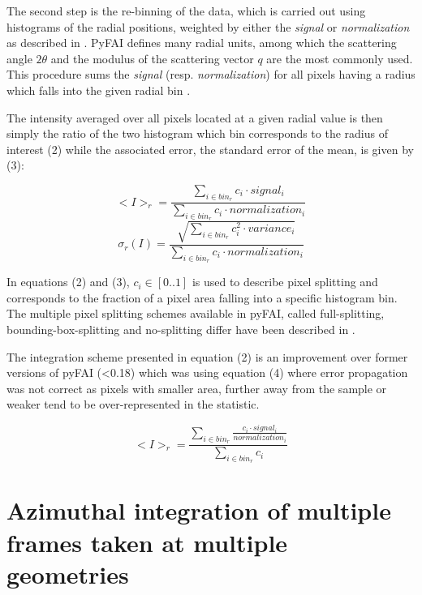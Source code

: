 \documentclass[preprint]{iucr}              %
\begin{document}
The second step is the re-binning of the data, which is carried out 
using histograms of the radial positions, 
weighted by either the \textit{signal} or \textit{normalization}
as described in .
PyFAI defines many radial units, among which the scattering angle $2\theta$
and the modulus of the scattering vector $q$ are the most commonly used.
This procedure sums the \textit{signal} (resp. \textit{normalization}) for all pixels
having a radius which falls into the given radial bin .

The intensity averaged over all pixels located at a given radial value is then simply 
the ratio of the two histogram which bin corresponds to the radius of interest (2) 
while the associated error, the standard error of the mean, is given by (3):

\begin{equation}
<I>_{r} = \frac{\sum\limits_{i \in bin_r} c_i \cdot signal_i}
                        {\sum\limits_{i \in bin_r} c_i \cdot normalization_i} 
\end{equation}
\begin{equation}
\sigma_{r}(I) = \frac{\sqrt{\sum\limits_{i \in bin_r} c_i^2 \cdot variance_i}}
                  {\sum\limits_{i \in bin_r} c_i \cdot normalization_i} 
\end{equation}

In equations (2) and (3), $c_i \in [0..1]$ is used to describe pixel splitting and 
corresponds to the fraction of a pixel area falling into a specific histogram bin. 
The multiple pixel splitting schemes available in pyFAI, called full-splitting, 
bounding-box-splitting and no-splitting differ have been described in
.

The integration scheme presented in equation (2) is an improvement over 
former versions of pyFAI (<0.18) which was using equation (4) where error propagation 
was not correct as pixels with smaller area, further away from the sample or weaker tend to be 
over-represented in the statistic.

\begin{equation}
<I>_{r} = \frac{\sum\limits_{i \in bin_r} \frac{ c_i \cdot
signal_i}{normalization_i}} {\sum\limits_{i \in bin_r} c_i} 
\end{equation}


\section{Azimuthal integration of multiple frames taken at multiple geometries}
\end{document}

